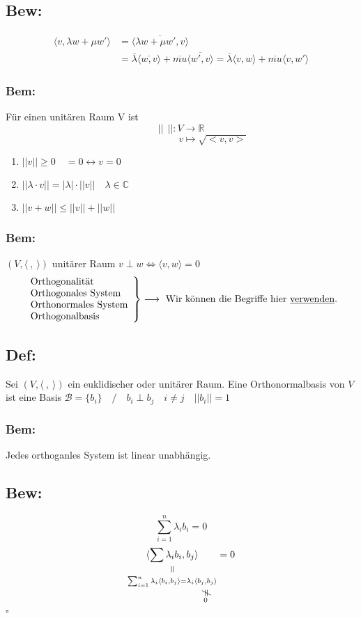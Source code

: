 \documentclass[titlepage,12pt,a4paper,ngerman]{report}
\newenvironment{bew}[1]{\subsection{Bew: #1}}{\hfill$\square$}
\newcommand{\Bew}[2]{\begin{bew}{#1}#2\end{bew}}
\newcommand{\verteq}{\rotatebox{90}{$\,=$}}
\newcommand{\equalto}[2]{\underset{\scriptstyle\overset{\mkern4mu\verteq}{#2}}{#1}}
\newcommand{\custo}[3]{\underset{\scriptstyle\overset{\mkern4mu\rotatebox{-90}{$\,#1$}}{#3}}{#2}}
\newcommand{\tx}[1]{\textrm{#1}}
\newcommand{\summ}[2]{\sum_{#1}^{#2}}
\begin{document}
\subsection{Bew:}
\begin{align*}
\langle v,\lambda w + \mu w'\rangle &= \langle \overline{\lambda w + \mu w', v} \rangle \\
&= \overline{\lambda} \langle \overline{w,v}\rangle + \overline{mu}\langle \overline{w',v}\rangle  = \overline{\lambda}\langle v,w \rangle + \overline{mu}\langle v,w'\rangle 
\end{align*}
\subsubsection{Bem:}
Für einen unitären Raum V ist
$$ || \ \ ||: V \to \mathbb{R}$$
$$ \qquad \qquad \qquad \ \ \, v \mapsto \sqrt{<v,v>}$$
\begin{enumerate}[1)]
	\item $ ||v|| \ge 0 \quad = 0 \leftrightarrow v = 0 $
	\item $ || \lambda \cdot v || = | \lambda| \cdot ||v|| \quad \lambda \in \mathbb{C} $
	\item $ ||v+w|| \le ||v|| + ||w|| $
\end{enumerate}

\subsubsection*{Bem:}
$(V, \langle\ ,\ \rangle)$ unitärer Raum $v \perp w \Leftrightarrow \langle v,w \rangle = 0$
$$\left. \begin{array}{l}
\tx{Orthogonalität} \\ \tx{Orthogonales System} \\ \tx{Orthonormales System} \\ \tx{Orthogonalbasis}
\end{array} \right  \} \longrightarrow \tx{ Wir können die Begriffe hier \underline{verwenden}.}$$
\subsection{Def:} Sei $ ( V, \langle\ ,\ \rangle)$ ein euklidischer oder unitärer Raum. Eine Orthonormalbasis von $V$ ist eine Basis $\mathcal B = \{b_i\}\quad /\quad b_i \perp b_j \quad i \neq j \quad ||b_i|| = 1$
\subsubsection*{Bem:} Jedes orthoganles System ist linear unabhängig.
\Bew{}{$$\summ{i=1}{n}\lambda_i b_i = 0$$
	$$\equalto{\langle \sum \lambda_i b_i, b_j\rangle}{\summ{i=1}{n}\lambda_i \langle b_i, b_j \rangle = \lambda_i \custo{\neq}{\langle b_j,b_j \rangle}{0}} = 0$$}
\end{document}
